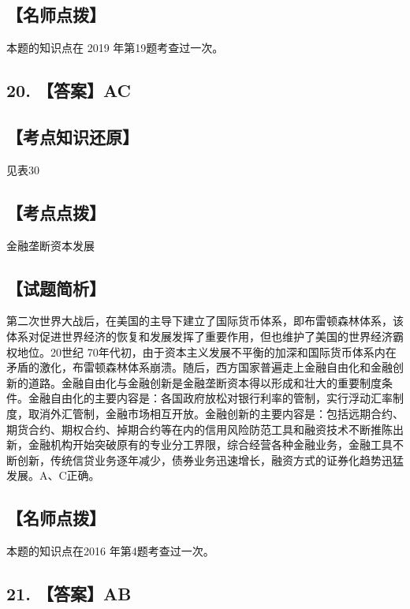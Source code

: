 \documentclass[UTF8,11pt]{ctexart}
\begin{document}
\subsection*{【名师点拨】}

本题的知识点在 2019 年第19题考查过一次。


\subsection*{20. 【答案】AC}

\subsection*{【考点知识还原】}

见表30


\subsection*{【考点点拨】}

金融垄断资本发展


\subsection*{【试题简析】}

第二次世界大战后，在美国的主导下建立了国际货币体系，即布雷顿森林体系，该体系对促进世界经济的恢复和发展发挥了重要作用，但也维护了美国的世界经济霸权地位。20世纪 70年代初，由于资本主义发展不平衡的加深和国际货币体系内在矛盾的激化，布雷顿森林体系崩溃。随后，西方国家普遍走上金融自由化和金融创新的道路。金融自由化与金融创新是金融垄断资本得以形成和壮大的重要制度条件。金融自由化的主要内容是：各国政府放松对银行利率的管制，实行浮动汇率制度，取消外汇管制，金融市场相互开放。金融创新的主要内容是：包括远期合约、期货合约、期权合约、掉期合约等在内的信用风险防范工具和融资技术不断推陈出新，金融机构开始突破原有的专业分工界限，综合经营各种金融业务，金融工具不断创新，传统信贷业务逐年减少，债券业务迅速增长，融资方式的证券化趋势迅猛发展。A、C正确。


\subsection*{【名师点拨】}

本题的知识点在2016 年第4题考查过一次。


\subsection*{21. 【答案】AB}
\end{document}
